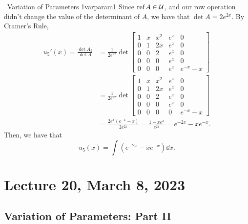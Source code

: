 \begin{example}{\Difficulty\,\Difficulty\,\,Variation of Parameters 1}{varparam1}
            Since \(\text{ref\,} A \in\mathcal{U}\), and our row operation didn't change the value of the determinant of \(A\), we have that \(\det A=2e^{2x}\). By Cramer's Rule,
            \begin{align*}
                u_5'(x)=\frac{\det A_5}{\det A}&=\frac{1}{2e^{2x}}\det \begin{bmatrix}
                1 & x & x^2 & e^x & 0 \\
                0 & 1 & 2x & e^x & 0 \\
                0 & 0 & 2 & e^x & 0 \\
                0 & 0 & 0 & e^x & 0 \\
                0 & 0 & 0 &  e^x & e^{-x}-x
            \end{bmatrix} \\
            &=\frac{1}{2e^{2x}}\det \begin{bmatrix}
                1 & x & x^2 & e^x & 0 \\
                0 & 1 & 2x & e^x & 0 \\
                0 & 0 & 2 & e^x & 0 \\
                0 & 0 & 0 & e^x & 0 \\
                0 & 0 & 0 & 0 & e^{-x}-x
            \end{bmatrix} \\
            &=\frac{2e^x(e^{-x}-x)}{2e^{2x}}=\frac{1-xe^{x}}{e^{2x}}=e^{-2x}-xe^{-x}.
            \end{align*}
            Then, we have that
            \begin{equation*}
                u_5(x)=\int (e^{-2x}-xe^{-x})\dd x.
            \end{equation*}
        \end{example}

\section{Lecture 20, March 8, 2023}

    \subsection{Variation of Parameters: Part II}

